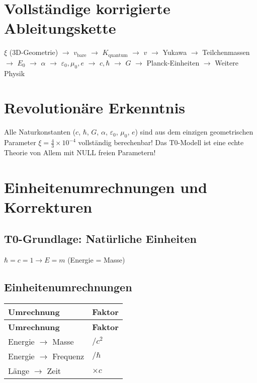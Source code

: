 \documentclass[12pt,a4paper]{article}
\begin{document}
	\section{Vollständige korrigierte Ableitungskette}
	\begin{center}
		\parbox{10cm}{\centering $\xi$ (3D-Geometrie) $\rightarrow$ $v_{\text{bare}}$ $\rightarrow$ $K_{\text{quantum}}$ $\rightarrow$ $v$ $\rightarrow$ Yukawa $\rightarrow$ Teilchenmassen $\rightarrow$ $E_0$ $\rightarrow$ $\alpha$ $\rightarrow$ $\varepsilon_0, \mu_0, e$ $\rightarrow$ $c, \hbar$ $\rightarrow$ $G$ $\rightarrow$ Planck-Einheiten $\rightarrow$ Weitere Physik}
	\end{center}
	
	\section{Revolutionäre Erkenntnis}
	Alle Naturkonstanten ($c$, $\hbar$, $G$, $\alpha$, $\varepsilon_0$, $\mu_0$, $e$) sind aus dem einzigen geometrischen Parameter $\xi = \frac{4}{3} \times 10^{-4}$ vollständig berechenbar! Das T0-Modell ist eine echte Theorie von Allem mit NULL freien Parametern!
	
	\section{Einheitenumrechnungen und Korrekturen}
	\subsection{T0-Grundlage: Natürliche Einheiten}
	\begin{center}
		$\hbar = c = 1 \rightarrow E = m$ (Energie = Masse)
	\end{center}
	
	\subsection{Einheitenumrechnungen}
	\begin{longtable}{|p{5cm}|p{5cm}|}
		\hline
		\textbf{Umrechnung} & \textbf{Faktor} \\
		\hline
		\endfirsthead
		\hline
		\textbf{Umrechnung} & \textbf{Faktor} \\
		\hline
		\endhead
		Energie $\rightarrow$ Masse & $/c^{2}$ \\
		\hline
		Energie $\rightarrow$ Frequenz & $/\hbar$ \\
		\hline
		Länge $\rightarrow$ Zeit & $\times c$ \\
		\hline
	\end{longtable}
	
\end{document}
